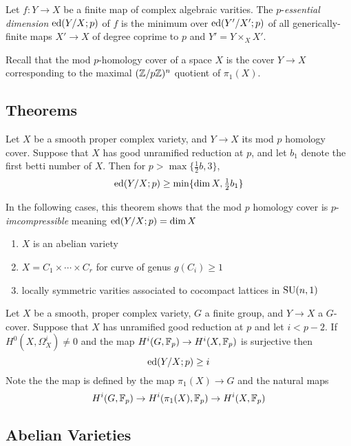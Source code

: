 \documentclass[12pt]{article}
\begin{document}
\begin{defn}
Let $f : Y \to X$ be a finite map of complex algebraic varities. The $p$-\textit{essential dimension} $\mathrm{ed}(Y/X ; p)$ of $f$ is the minimum over $\mathrm{ed}(Y'/X' ; p)$ of all generically-finite maps $X' \to X$ of degree coprime to $p$ and $Y' = Y \times_X X'$.
\end{defn}

\begin{defn}
Recall that the mod $p$-homology cover of a space $X$ is the \etale cover $Y \to X$ corresponding to the maximal $(\mathbb{Z} / p \mathbb{Z})^n$ quotient of $\pi_1(X)$.
\end{defn}

\subsection{Theorems}

\begin{theorem}[A]
Let $X$ be a smooth proper complex variety, and $Y \to X$ its mod $p$ homology cover. Suppose that $X$ has good unramified reduction at $p$, and let $b_1$ denote the first betti number of $X$. Then for $p > \max \{ \tfrac{1}{2} b, 3 \}$,
\[ \mathrm{ed}(Y/X ; p) \ge \min \{ \dim{X}, \tfrac{1}{2} b_1 \} \]
\end{theorem}


In the following cases, this theorem shows that the mod $p$ homology cover is $p$-\textit{imcompressible} meaning $\mathrm{ed}(Y/X ; p) = \dim{X}$ 
\begin{enumerate}
\item $X$ is an abelian variety
\item $X = C_1 \times \cdots \times C_r$ for curve of genus $g(C_i) \ge 1$
\item locally symmetric varities associated to cocompact lattices in $\mathrm{SU}(n, 1)$
\end{enumerate}

\begin{theorem}[B]
Let $X$ be a smooth, proper complex variety, $G$ a finite group, and $Y \to X$ a $G$-cover. Suppose that $X$ has unramified good reduction at $p$ and let $i < p -2$. If $H^0(X, \Omega_X^i) \neq 0$ and the map $H^i(G, \mathbb{F}_p) \to H^i(X, \mathbb{F}_p)$ is surjective then
\[ \mathrm{ed}(Y/X ; p) \ge i \]
Note the the map is defined by the map $\pi_1(X) \to G$ and the natural maps
\[ H^i(G, \mathbb{F}_p) \to H^i(\pi_1(X), \mathbb{F}_p) \to H^i(X, \mathbb{F}_p) \] 
\end{theorem}

\subsection{Abelian Varieties}
\end{document}
